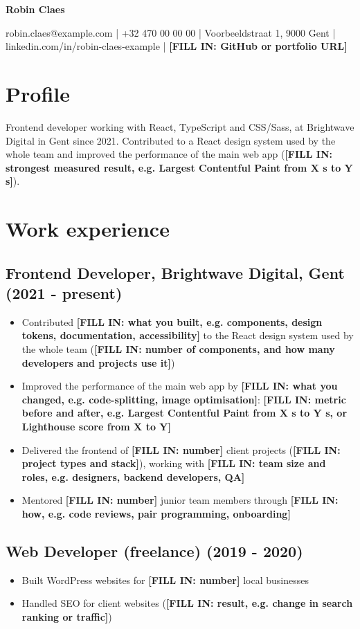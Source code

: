 \documentclass[10pt]{article}
\newcommand{\fillin}[1]{\textcolor{fillin}{\textbf{[#1]}}}
\begin{document}
{\LARGE\bfseries Robin Claes\par}\smallskip
robin.claes@example.com | +32 470 00 00 00 | Voorbeeldstraat 1, 9000 Gent | linkedin.com/in/robin-claes-example | \fillin{FILL IN: GitHub or portfolio URL}\par
\section*{Profile}
Frontend developer working with React, TypeScript and CSS/Sass, at Brightwave Digital in Gent since 2021. Contributed to a React design system used by the whole team and improved the performance of the main web app (\fillin{FILL IN: strongest measured result, e.g. Largest Contentful Paint from X s to Y s}).\par
\section*{Work experience}
\subsection*{Frontend Developer, Brightwave Digital, Gent (2021 - present)}
\begin{itemize}
\item{} Contributed \fillin{FILL IN: what you built, e.g. components, design tokens, documentation, accessibility} to the React design system used by the whole team (\fillin{FILL IN: number of components, and how many developers and projects use it})
\item{} Improved the performance of the main web app by \fillin{FILL IN: what you changed, e.g. code-splitting, image optimisation}: \fillin{FILL IN: metric before and after, e.g. Largest Contentful Paint from X s to Y s, or Lighthouse score from X to Y}
\item{} Delivered the frontend of \fillin{FILL IN: number} client projects (\fillin{FILL IN: project types and stack}), working with \fillin{FILL IN: team size and roles, e.g. designers, backend developers, QA}
\item{} Mentored \fillin{FILL IN: number} junior team members through \fillin{FILL IN: how, e.g. code reviews, pair programming, onboarding}
\end{itemize}
\subsection*{Web Developer (freelance) (2019 - 2020)}
\begin{itemize}
\item{} Built WordPress websites for \fillin{FILL IN: number} local businesses
\item{} Handled SEO for client websites (\fillin{FILL IN: result, e.g. change in search ranking or traffic})
\end{itemize}
\end{document}
